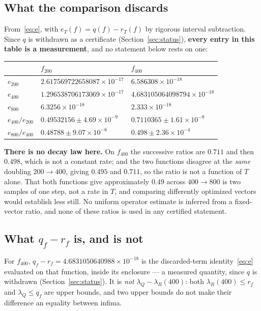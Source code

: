 \documentclass[11pt,a4paper]{article}
\theoremstyle{definition}
\theoremstyle{remark}
\newcommand{\lQ}{\lambda_{Q}}
\newcommand{\lR}{\lambda_{R}}
\begin{document}
\subsection{What the comparison discards}

From~\eqref{eq:e}, with $e_T(f) = q(f) - r_T(f)$ by rigorous interval
subtraction. Since $q$ is withdrawn as a certificate
(Section~\ref{sec:status}), \textbf{every entry in this table is a measurement},
and no statement below rests on one:
\begin{center}
\begin{tabular}{lll}
\toprule
 & $f_{200}$ & $f_{400}$ \\
\midrule
$e_{200}$ & $2.617569722658087\times10^{-17}$ & $6.586308\times10^{-18}$ \\
$e_{400}$ & $1.296538706173069\times10^{-17}$ & $4.683105064098794\times10^{-18}$ \\
$e_{800}$ & $6.3256\times10^{-18}$            & $2.333\times10^{-18}$ \\
\midrule
$e_{400}/e_{200}$ & $0.49532156 \pm 4.69\times10^{-9}$ & $0.7110365 \pm 1.61\times10^{-8}$ \\
$e_{800}/e_{400}$ & $0.48788 \pm 9.07\times10^{-6}$    & $0.498 \pm 2.36\times10^{-4}$ \\
\bottomrule
\end{tabular}
\end{center}

\textbf{There is no decay law here.} On $f_{400}$ the successive ratios are
$0.711$ and then $0.498$, which is not a constant rate; and the two functions
disagree at the \emph{same} doubling $200 \to 400$, giving $0.495$ and $0.711$,
so the ratio is not a function of $T$ alone. That both functions give
approximately $0.49$ across $400 \to 800$ is two samples of one step, not a rate
in $T$, and comparing differently optimized vectors would establish less still.
No uniform operator estimate is inferred from a fixed-vector ratio, and none of
these ratios is used in any certified statement.

\subsection{What $q_f - r_f$ is, and is not}

For $f_{400}$, $q_f - r_f = 4.6831050640988\times10^{-18}$ is the
discarded-term identity~\eqref{eq:e} evaluated on that function, inside its
enclosure --- a measured quantity, since $q$ is withdrawn
(Section~\ref{sec:status}). It is \emph{not} $\lQ - \lR(400)$: both $\lR(400) \le r_f$
and $\lQ \le q_f$ are upper bounds, and two upper bounds do not make their
difference an equality between infima.
\end{document}
